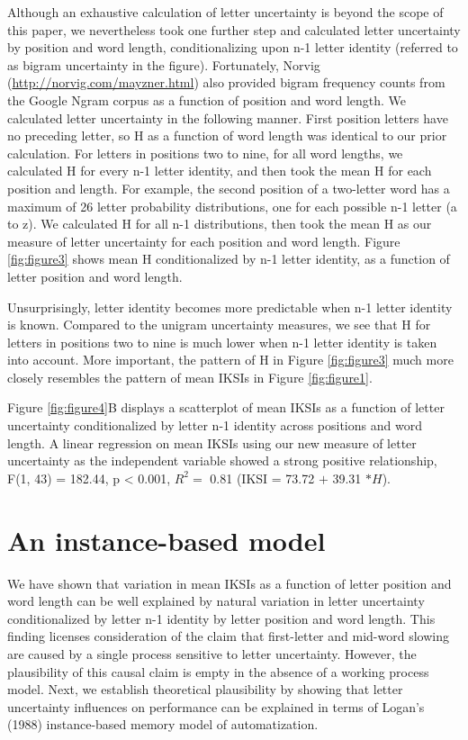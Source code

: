 \documentclass[,man,floatsintext]{apa6}
\begin{document}
Although an exhaustive calculation of letter uncertainty is beyond the scope of this paper, we nevertheless took one further step and calculated letter uncertainty by position and word length, conditionalizing upon n-1 letter identity (referred to as bigram uncertainty in the figure). Fortunately, Norvig (\url{http://norvig.com/mayzner.html}) also provided bigram frequency counts from the Google Ngram corpus as a function of position and word length. We calculated letter uncertainty in the following manner. First position letters have no preceding letter, so H as a function of word length was identical to our prior calculation. For letters in positions two to nine, for all word lengths, we calculated H for every n-1 letter identity, and then took the mean H for each position and length. For example, the second position of a two-letter word has a maximum of 26 letter probability distributions, one for each possible n-1 letter (a to z). We calculated H for all n-1 distributions, then took the mean H as our measure of letter uncertainty for each position and word length. Figure \ref{fig:figure3} shows mean H conditionalized by n-1 letter identity, as a function of letter position and word length.

Unsurprisingly, letter identity becomes more predictable when n-1 letter identity is known. Compared to the unigram uncertainty measures, we see that H for letters in positions two to nine is much lower when n-1 letter identity is taken into account. More important, the pattern of H in Figure \ref{fig:figure3} much more closely resembles the pattern of mean IKSIs in Figure \ref{fig:figure1}.

Figure \ref{fig:figure4}B displays a scatterplot of mean IKSIs as a function of letter uncertainty conditionalized by letter n-1 identity across positions and word length. A linear regression on mean IKSIs using our new measure of letter uncertainty as the independent variable showed a strong positive relationship, F(1, 43) = 182.44, p \textless{} 0.001, \(R^2 =\) 0.81 (IKSI = 73.72 \(+\) 39.31 \(*H\)).

\hypertarget{an-instance-based-model}{%
\section{An instance-based model}\label{an-instance-based-model}}

We have shown that variation in mean IKSIs as a function of letter position and word length can be well explained by natural variation in letter uncertainty conditionalized by letter n-1 identity by letter position and word length. This finding licenses consideration of the claim that first-letter and mid-word slowing are caused by a single process sensitive to letter uncertainty. However, the plausibility of this causal claim is empty in the absence of a working process model. Next, we establish theoretical plausibility by showing that letter uncertainty influences on performance can be explained in terms of Logan's (1988) instance-based memory model of automatization.
\end{document}
